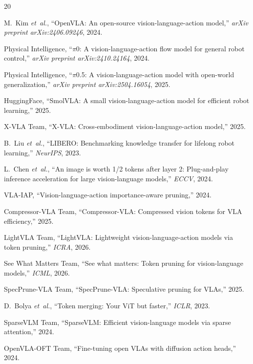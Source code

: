 \documentclass[10pt,letterpaper]{article}
\newcommand{\etal}{\textit{et~al.}}
\begin{document}

\begin{thebibliography}{20}

M.~Kim \etal, ``OpenVLA: An open-source vision-language-action model,'' \textit{arXiv preprint arXiv:2406.09246}, 2024.

Physical Intelligence, ``$\pi$0: A vision-language-action flow model for general robot control,'' \textit{arXiv preprint arXiv:2410.24164}, 2024.

Physical Intelligence, ``$\pi$0.5: A vision-language-action model with open-world generalization,'' \textit{arXiv preprint arXiv:2504.16054}, 2025.

HuggingFace, ``SmolVLA: A small vision-language-action model for efficient robot learning,'' 2025.

X-VLA Team, ``X-VLA: Cross-embodiment vision-language-action model,'' 2025.

B.~Liu \etal, ``LIBERO: Benchmarking knowledge transfer for lifelong robot learning,'' \textit{NeurIPS}, 2023.

L.~Chen \etal, ``An image is worth 1/2 tokens after layer 2: Plug-and-play inference acceleration for large vision-language models,'' \textit{ECCV}, 2024.

VLA-IAP, ``Vision-language-action importance-aware pruning,'' 2024.

Compressor-VLA Team, ``Compressor-VLA: Compressed vision tokens for VLA efficiency,'' 2025.

LightVLA Team, ``LightVLA: Lightweight vision-language-action models via token pruning,'' \textit{ICRA}, 2026.

See What Matters Team, ``See what matters: Token pruning for vision-language models,'' \textit{ICML}, 2026.

SpecPrune-VLA Team, ``SpecPrune-VLA: Speculative pruning for VLAs,'' 2025.

D.~Bolya \etal, ``Token merging: Your ViT but faster,'' \textit{ICLR}, 2023.

SparseVLM Team, ``SparseVLM: Efficient vision-language models via sparse attention,'' 2024.

OpenVLA-OFT Team, ``Fine-tuning open VLAs with diffusion action heads,'' 2024.

\end{thebibliography}
\end{document}
